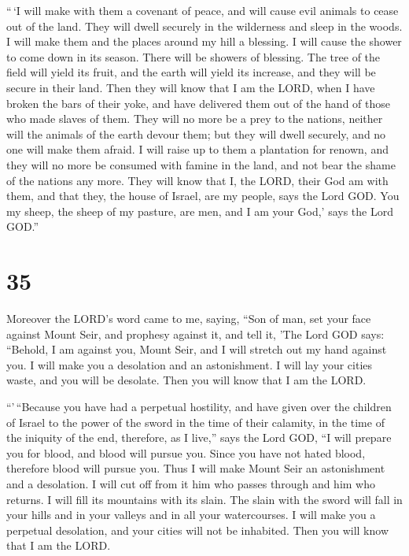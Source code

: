  ``\,`I will make with them a covenant of peace, and will
cause evil animals to cease out of the land. They will dwell securely in
the wilderness and sleep in the woods.  I will make them
and the places around my hill a blessing. I will cause the shower to
come down in its season. There will be showers of blessing.
 The tree of the field will yield its fruit, and the
earth will yield its increase, and they will be secure in their land.
Then they will know that I am the LORD, when I have broken the bars of
their yoke, and have delivered them out of the hand of those who made
slaves of them.  They will no more be a prey to the
nations, neither will the animals of the earth devour them; but they
will dwell securely, and no one will make them afraid.  I
will raise up to them a plantation for renown, and they will no more be
consumed with famine in the land, and not bear the shame of the nations
any more.  They will know that I, the LORD, their God am
with them, and that they, the house of Israel, are my people, says the
Lord GOD.  You my sheep, the sheep of my pasture, are
men, and I am your God,' says the Lord GOD.''

\hypertarget{section-33}{%
\section{35}\label{section-33}}

 Moreover the LORD's word came to me, saying,
 ``Son of man, set your face against Mount Seir, and
prophesy against it,  and tell it, 'The Lord GOD says:
``Behold, I am against you, Mount Seir, and I will stretch out my hand
against you. I will make you a desolation and an astonishment.
 I will lay your cities waste, and you will be desolate.
Then you will know that I am the LORD.

 ``'\,``Because you have had a perpetual hostility, and
have given over the children of Israel to the power of the sword in the
time of their calamity, in the time of the iniquity of the end,
 therefore, as I live,'' says the Lord GOD, ``I will
prepare you for blood, and blood will pursue you. Since you have not
hated blood, therefore blood will pursue you.  Thus I will
make Mount Seir an astonishment and a desolation. I will cut off from it
him who passes through and him who returns.  I will fill
its mountains with its slain. The slain with the sword will fall in your
hills and in your valleys and in all your watercourses.  I
will make you a perpetual desolation, and your cities will not be
inhabited. Then you will know that I am the LORD.

